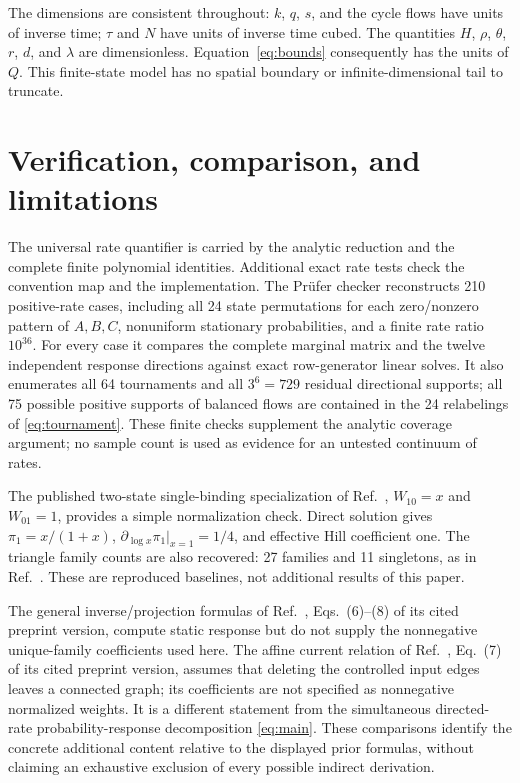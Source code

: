 \documentclass[11pt,a4paper]{article}
\begin{document}
The dimensions are consistent throughout: $k$, $q$, $s$, and the cycle
flows have units of inverse time; $\tau$ and $N$ have units of inverse
time cubed. The quantities $H$, $\rho$, $\theta$, $r$, $d$, and $\lambda$
are dimensionless. Equation~\eqref{eq:bounds} consequently has the
units of $Q$. This finite-state model has no spatial boundary or
infinite-dimensional tail to truncate.

\section{Verification, comparison, and limitations}

The universal rate quantifier is carried by the analytic reduction and
the complete finite polynomial identities. Additional exact rate tests
check the convention map and the implementation. The Pr\"ufer checker
reconstructs 210 positive-rate cases, including all 24 state permutations
for each zero/nonzero pattern of $A,B,C$, nonuniform stationary
probabilities, and a finite rate ratio $10^{36}$. For every case it
compares the complete marginal matrix and the twelve independent
response directions against exact row-generator linear solves. It also
enumerates all 64 tournaments and all $3^6=729$ residual directional
supports; all 75 possible positive supports of balanced flows are contained in the
24 relabelings of \eqref{eq:tournament}. These finite checks supplement
the analytic coverage argument; no sample count is used as evidence
for an untested continuum of rates.

The published two-state single-binding specialization of
Ref.~\cite{OwenHorowitz2023}, $W_{10}=x$ and $W_{01}=1$, provides a
simple normalization check. Direct solution gives
$\pi_1=x/(1+x)$, $\partial_{\log x}\pi_1|_{x=1}=1/4$, and effective
Hill coefficient one. The triangle family counts are also recovered:
27 families and 11 singletons, as in Ref.~\cite{FancherHorowitz2026}.
These are reproduced baselines, not additional results of this paper.

The general inverse/projection formulas of
Ref.~\cite{AslyamovEsposito2024}, Eqs.~(6)--(8) of its cited preprint
version, compute static response but do not supply the nonnegative
unique-family coefficients used here. The affine current relation of
Ref.~\cite{DalCengio2025}, Eq.~(7) of its cited preprint version, assumes
that deleting the controlled input edges leaves a connected graph;
its coefficients are not specified as nonnegative normalized weights.
It is a different statement from the simultaneous directed-rate
probability-response decomposition \eqref{eq:main}. These comparisons
identify the concrete additional content relative to the displayed
prior formulas, without claiming an exhaustive exclusion of every
possible indirect derivation.
\end{document}
